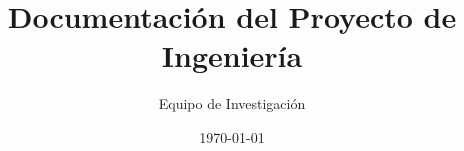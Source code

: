 \documentclass[12pt,a4paper]{article}
\title{Documentación del Proyecto de Ingeniería}
\author{Equipo de Investigación}
\date{\today}
\begin{document}

\tableofcontents
\newpage
\doublespacing






% 



\newpage
% 

\end{document}
